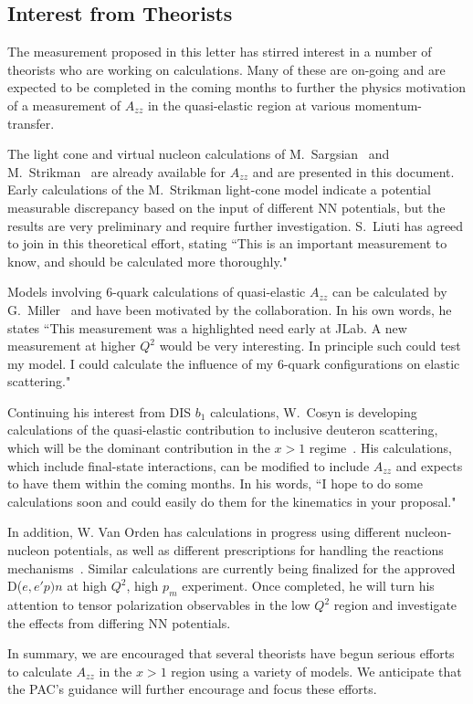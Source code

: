 \subsection{Interest from Theorists}

The measurement proposed in this letter has stirred interest in a number of theorists who are working on calculations. Many of these are on-going and are expected to be completed in the coming months to further the physics motivation of a measurement of $A_{zz}$ in the quasi-elastic region at various momentum-transfer.

The light cone and virtual nucleon calculations of M.~Sargsian~\cite{misak-convo} and M.~Strikman~\cite{strikman-convo} are already available for $A_{zz}$ and are presented in this document. Early calculations of the M.~Strikman light-cone model indicate a potential measurable discrepancy based on the input of different NN potentials, but the results are very preliminary and require further investigation. S.~Liuti has agreed to join in this theoretical effort, stating ``This is an important measurement to know, and should be calculated more thoroughly."~\cite{liuti-convo}

Models involving 6-quark calculations of quasi-elastic $A_{zz}$ can be calculated by G.~Miller~\cite{miller-convo} and have been motivated by the collaboration. In his own words, he states ``This measurement was a highlighted need early at JLab. A new measurement at higher $Q^2$ would be very interesting. In principle such could test my model. I could calculate the influence of my 6-quark configurations on elastic scattering."

Continuing his interest from DIS $b_1$ calculations, W.~Cosyn is developing calculations of the quasi-elastic contribution to inclusive deuteron scattering, which will be the dominant contribution in the $x>1$ regime~\cite{cosyn-convo}. His calculations, which include final-state interactions, can be modified to include $A_{zz}$ and expects to have them within the coming months. In his words, ``I hope to do some 
calculations soon and could easily do them for the kinematics in your 
proposal."


In addition, W. Van Orden has calculations in progress using different nucleon-nucleon potentials, as well as different prescriptions for handling the reactions mechanisms~\cite{vanorden-convo}.  Similar calculations are currently being finalized for the approved
D($e,e'p)n$ at high $Q^2$, high $p_m$ experiment. Once completed, he will turn his attention to tensor polarization observables in the low $Q^2$ region and investigate the effects from differing NN potentials.

In summary, we are encouraged that several theorists have begun serious efforts to calculate $A_{zz}$ in the $x>1$ region using a variety of models. We anticipate that the PAC's guidance will further encourage and focus these efforts.